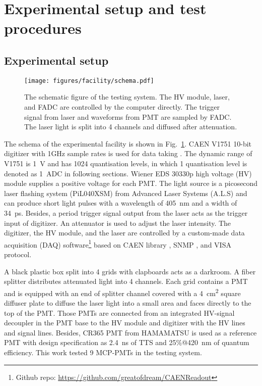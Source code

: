 \section{Experimental setup and test procedures}
\label{SetUp}
\subsection{Experimental setup}
\label{sec:setup}
\begin{figure}[!htbp]
    \centering
    \texttt{[image: figures/facility/schema.pdf]}
    \caption{The schematic figure of the testing system. The HV module, laser, and FADC are controlled by the computer directly. The trigger signal from laser and waveforms from PMT are sampled by FADC. The laser light is split into 4 channels and diffused after attenuation.}
    \label{fig:facility}
\end{figure}

The schema of the experimental facility is shown in Fig.~\ref{fig:facility}. CAEN V1751 10-bit digitizer with 1GHz sample rates is used for data taking \cite{CAENV1751}. The dynamic range of V1751 is \SI{1}{V} and has 1024 quantisation levels, in which 1 quantisation level is denoted as \SI{1}{ADC} \cite{JUNOPrototype} in following sections. Wiener EDS 30330p high voltage (HV) module \cite{WIENERHV} supplies a positive voltage for each PMT. The light source is a picosecond laser flashing system (PiL040XSM) from Advanced Laser Systems (A.L.S) \cite{NTKLaser} and can produce short light pulses with a wavelength of \SI{405}{nm} and a width of \SI{34}{ps}. Besides, a period trigger signal output from the laser acts as the trigger input of digitizer. An attenuator is used to adjust the laser intensity. The digitizer, the HV module, and the laser are controlled by a custom-made data acquisition (DAQ) software\footnote{Github repo: \url{https://github.com/greatofdream/CAENReadout}} based on CAEN library \cite{CAENLIB}, SNMP \cite{SNMP}, and VISA \cite{VISA} protocol.

A black plastic box split into 4 grids with clapboards acts as a darkroom. A fiber splitter distributes attenuated light into 4 channels. Each grid contains a PMT and is equipped with an end of splitter channel covered with a \SI{4}{cm\tothe{2}} square diffuser plate to diffuse the laser light into a small area and faces directly to the top of the PMT. Those PMTs are connected from an integrated HV-signal decoupler in the PMT base to the HV module and digitizer with the HV lines and signal lines. Besides, CR365 PMT \cite{BJBS} from HAMAMATSU is used as a reference PMT with design specification as \SI{2.4}{ns} of TTS and 25\%@\SI{420}{nm} of quantum efficiency. This work tested 9 MCP-PMTs in the testing system.

